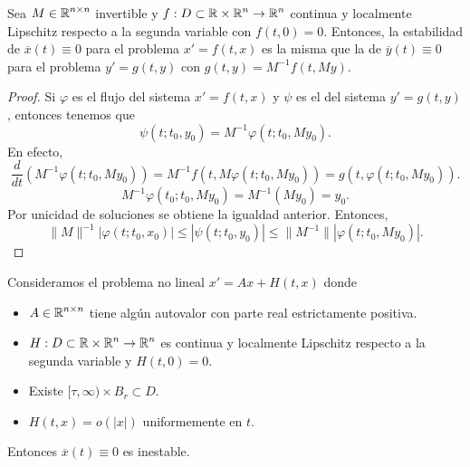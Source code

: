 \begin{lema}
Sea $\displaystyle M \in \mathbb{R}^{n \times n} $ invertible y $\displaystyle f : D \subset \mathbb{R} \times \mathbb{R}^{n}\to \mathbb{R}^{n} $ continua y localmente Lipschitz respecto a la segunda variable con $\displaystyle f\left(t,0\right)=0 $. Entonces, la estabilidad de $\displaystyle \overline{x}\left(t\right)\equiv 0 $ para el problema $\displaystyle x' = f\left(t,x\right) $ es la misma que la de $\displaystyle \overline{y}\left(t\right)\equiv 0 $ para el problema $\displaystyle y'=g\left(t,y\right) $ con $\displaystyle g\left(t,y\right)=M^{-1}f\left(t,My\right) $.  
\end{lema}
\begin{proof}
Si $\displaystyle \varphi $ es el flujo del sistema $\displaystyle x' = f\left(t,x\right) $ y $\displaystyle \psi $ es el del sistema $\displaystyle y' = g\left(t,y\right) $, entonces tenemos que 
\[\psi\left(t; t_{0}, y_{0}\right)=M^{-1}\varphi\left(t; t_{0}, My_{0}\right) .\]
En efecto, 
\[\frac{d}{dt}\left(M^{-1}\varphi\left(t; t_{0}, My_{0}\right)\right) = M^{-1}f\left(t, M\varphi\left(t; t_{0}, My_{0}\right)\right) = g\left(t, \varphi\left(t; t_{0}, My_{0}\right)\right).\]
\[M^{-1}\varphi\left(t_{0}; t_{0}, My_{0}\right)=M^{-1}\left(My_{0}\right)=y_{0} .\]
Por unicidad de soluciones se obtiene la igualdad anterior. 
Entonces, 
\[ \|M\|^{-1} \left|\varphi\left(t; t_{0}, x_{0}\right)\right| \leq \left|\psi\left(t; t_{0}, y_{0}\right)\right|\leq \|M^{-1}\| \left|\varphi\left(t;  t_{0}, My_{0}\right)\right| .\]
\end{proof}
\begin{theorem}
Consideramos el problema no lineal $\displaystyle x' = Ax + H\left(t,x\right) $ donde
\begin{itemize}
\item $\displaystyle A \in \mathbb{R}^{n \times n} $ tiene algún autovalor con parte real estrictamente positiva.
\item $\displaystyle H : D \subset \mathbb{R} \times \mathbb{R}^{n} \to \mathbb{R}^{n} $ es continua y localmente Lipschitz respecto a la segunda variable y $\displaystyle H\left(t,0\right)=0 $.
\item Existe $\displaystyle [\tau, \infty) \times B_{r}\subset D $.
\item $\displaystyle H\left(t,x\right)=o\left( \left|x\right|\right) $ uniformemente en $\displaystyle t $.
\end{itemize}
Entonces $\displaystyle \overline{x}\left(t\right)\equiv 0 $ es inestable.
\end{theorem}
